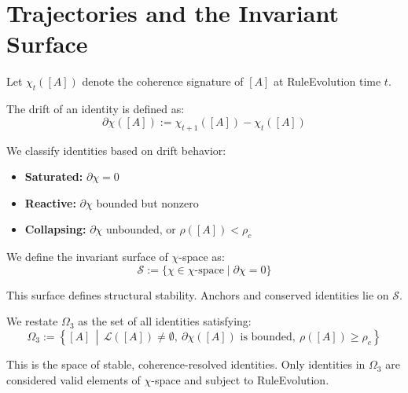 \section{Trajectories and the Invariant Surface} \label{trajectories-and-the-invariant-surface}

Let $\chi_t([A])$ denote the coherence signature of $[A]$ at RuleEvolution time $t$.

\begin{definition}[Drift] \label{def:drift}
The drift of an identity is defined as:
\begin{equation} \label{eq:drift}
\partial \chi([A]) := \chi_{t+1}([A]) - \chi_t([A])
\end{equation}
\end{definition}

We classify identities based on drift behavior:
\begin{itemize}
  \item \textbf{Saturated:} $\partial \chi = 0$
  \item \textbf{Reactive:} $\partial \chi$ bounded but nonzero
  \item \textbf{Collapsing:} $\partial \chi$ unbounded, or $\rho([A]) < \rho_c$
\end{itemize}

\begin{definition} \label{def:invariant-surface}
We define the invariant surface of $\chi$-space as:
\begin{equation} \label{eq:invariant-surface}
\mathcal{S} := \{ \chi \in \chi\text{-space} \mid \partial \chi = 0 \}
\end{equation}
\end{definition}

This surface defines structural stability.  
Anchors and conserved identities lie on $\mathcal{S}$.

\begin{definition} \label{def:omega3-revised}
We restate $\Omega_3$ as the set of all identities satisfying:
\begin{equation} \label{eq:omega3-closure}
\Omega_3 := \left\{ [A] \,\middle|\, \mathcal{L}([A]) \neq \emptyset,\ \partial \chi([A]) \text{ is bounded},\ \rho([A]) \geq \rho_c \right\}
\end{equation}
\end{definition}

This is the space of stable, coherence-resolved identities.  
Only identities in $\Omega_3$ are considered valid elements of $\chi$-space and subject to RuleEvolution.


